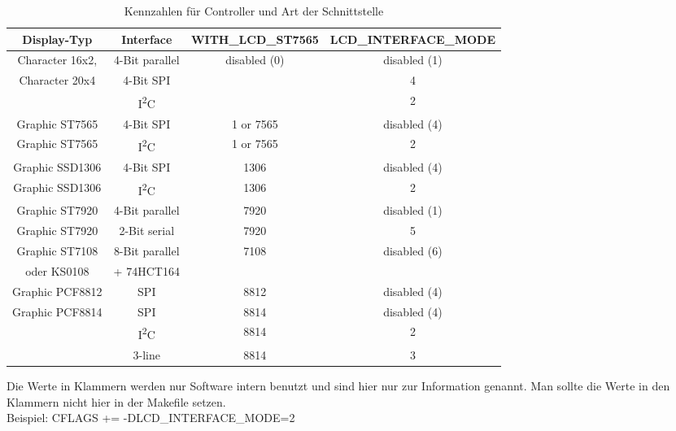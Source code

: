 \begin{description}
\begin{table}[H]
  \begin{center}
    \begin{tabular}{| c | c | c | c|}
    \hline
 Display-Typ        &  Interface     & WITH\_LCD\_ST7565 &  LCD\_INTERFACE\_MODE \\
    \hline
    \hline
  Character 16x2,   & 4-Bit parallel &  disabled (0)      & disabled (1) \\
  Character 20x4    &  4-Bit SPI     &                    &    4   \\
                  & I\textsuperscript{2}C &               &    2   \\
    \hline
  Graphic ST7565    & 4-Bit SPI      & 1 or 7565          & disabled (4) \\
    \hline
  Graphic ST7565  & I\textsuperscript{2}C & 1 or 7565     &   2 \\
    \hline
  Graphic SSD1306   & 4-Bit SPI      & 1306               & disabled (4) \\
    \hline
  Graphic SSD1306 & I\textsuperscript{2}C & 1306          &   2 \\
    \hline
  Graphic ST7920    & 4-Bit parallel  & 7920              & disabled (1) \\
    \hline
  Graphic ST7920    & 2-Bit serial    & 7920               &  5 \\
    \hline
  Graphic ST7108    & 8-Bit parallel  & 7108              & disabled (6) \\
  oder KS0108       &    + 74HCT164   &                   &      \\
    \hline
  Graphic PCF8812   & SPI             & 8812              & disabled (4) \\
    \hline
  Graphic PCF8814   & SPI             & 8814              & disabled (4) \\
                  & I\textsuperscript{2}C & 8814          &   2 \\
                    & 3-line          & 8814              &   3 \\
    \hline
    \end{tabular}
  \end{center}
  \caption{Kennzahlen für Controller und  Art der Schnittstelle}
  \label{tab:cod-display}
\end{table}

Die Werte in Klammern werden nur Software intern benutzt und sind hier nur zur Information genannt.
Man sollte die Werte in den Klammern nicht hier in der Makefile setzen.\\
Beispiel: CFLAGS += -DLCD\_INTERFACE\_MODE=2


\end{description}
